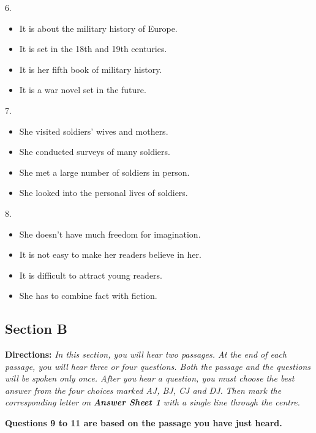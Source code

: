 \documentclass[UTF8,11pt]{ctexart}
\begin{document}
6.


\begin{itemize}[leftmargin=2em,itemsep=.2em,topsep=.4em]\item[A.] It is about the military history of Europe.
\item[B.] It is set in the 18th and 19th centuries.
\item[C.] It is her fifth book of military history.
\item[D.] It is a war novel set in the future.
\end{itemize}

7.


\begin{itemize}[leftmargin=2em,itemsep=.2em,topsep=.4em]\item[A.] She visited soldiers' wives and mothers.
\item[B.] She conducted surveys of many soldiers.
\item[C.] She met a large number of soldiers in person.
\item[D.] She looked into the personal lives of soldiers.
\end{itemize}

8.


\begin{itemize}[leftmargin=2em,itemsep=.2em,topsep=.4em]\item[A.] She doesn't have much freedom for imagination.
\item[B.] It is not easy to make her readers believe in her.
\item[C.] It is difficult to attract young readers.
\item[D.] She has to combine fact with fiction.
\end{itemize}

\subsection*{\textbf{Section B}}


\textbf{Directions: }\textit{In this section, you will hear two passages. At the end of each passage, you will hear} \textit{three or four questions. Both the passage and the questions will be spoken only once. After you} \textit{hear a question, you must choose the best answer from the four choices marked AJ, BJ, CJ and DJ.} \textit{Then mark the corresponding letter on }\textbf{\textit{Answer Sheet 1 }}\textit{with a single line through the centre.}


\textbf{Questions 9 to 11 are based on the passage you have just heard.}
\end{document}

